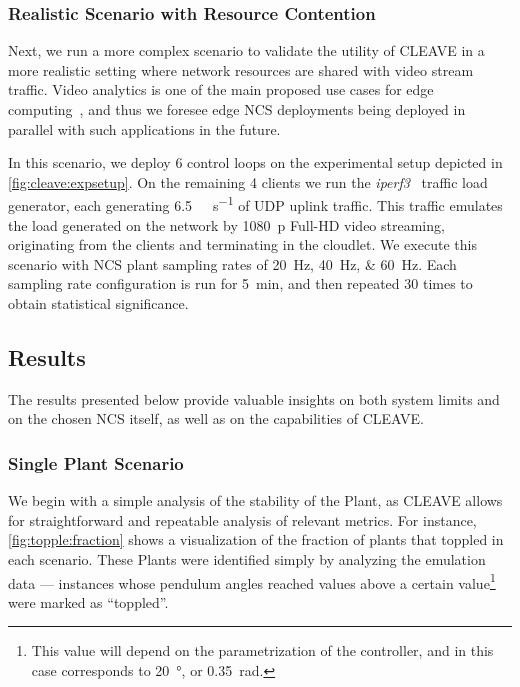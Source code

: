 \subsubsection{Realistic Scenario with Resource Contention}

Next, we run a more complex scenario to validate the utility of \ac{CLEAVE} in a more realistic setting where network resources are shared with video stream traffic.
Video analytics is one of the main proposed use cases for edge computing~\cite{Ananthanarayanan2017Analytics,Yi2017Analytics,Wang2018Analytics}, and thus we foresee edge \ac{NCS} deployments being deployed in parallel with such applications in the future.

In this scenario, we deploy \num{6} control loops on the experimental setup depicted in \cref{fig:cleave:expsetup}.
On the remaining \num{4} clients we run the \emph{iperf3}~\cite{iperf3} traffic load generator, each generating \SI[per-mode=symbol]{6.5}{\mega\bit\per\second} of \ac{UDP} uplink traffic.
This traffic emulates the load generated on the network by \SI{1080}{p} Full-HD video streaming, originating from the clients and terminating in the cloudlet.
We execute this scenario with \ac{NCS} plant sampling rates of \SIlist{20;40;60}{\hertz}.
Each sampling rate configuration is run for \SI{5}{\minute}, and then repeated \num{30} times to obtain statistical significance.

\subsection{Results}\label{ssec:results}

The results presented below provide valuable insights on both system limits and on the chosen \ac{NCS} itself, as well as on the capabilities of \ac{CLEAVE}.

\subsubsection{Single Plant Scenario}

We begin with a simple analysis of the stability of the Plant, as \ac{CLEAVE} allows for straightforward and repeatable analysis of relevant metrics.  
For instance, \cref{fig:topple:fraction} shows a visualization of the fraction of plants that toppled in each scenario.
These Plants were identified simply by analyzing the emulation data --- instances whose pendulum angles reached values above a certain value\footnote{This value will depend on the parametrization of the controller, and in this case corresponds to \SI{20}{\degree}, or \SI{0.35}{\radian}.} were marked as ``toppled''.

